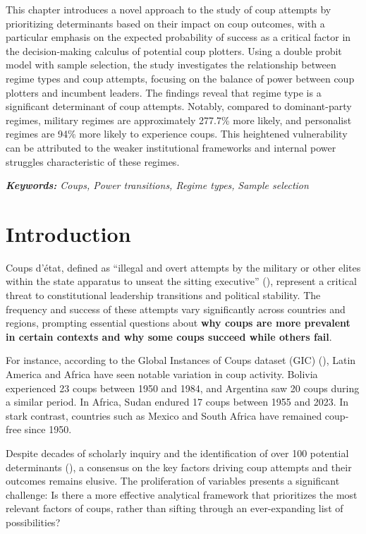 \documentclass[
  12pt,
]{report}
\begin{document}
This chapter introduces a novel approach to the study of coup attempts
by prioritizing determinants based on their impact on coup outcomes,
with a particular emphasis on the expected probability of success as a
critical factor in the decision-making calculus of potential coup
plotters. Using a double probit model with sample selection, the study
investigates the relationship between regime types and coup attempts,
focusing on the balance of power between coup plotters and incumbent
leaders. The findings reveal that regime type is a significant
determinant of coup attempts. Notably, compared to dominant-party
regimes, military regimes are approximately 277.7\% more likely, and
personalist regimes are 94\% more likely to experience coups. This
heightened vulnerability can be attributed to the weaker institutional
frameworks and internal power struggles characteristic of these regimes.

\emph{\textbf{Keywords:} Coups, Power transitions, Regime types,}
\emph{Sample selection}

\newpage

\section{Introduction}\label{introduction-1}

Coups d'état, defined as ``illegal and overt attempts by the military or
other elites within the state apparatus to unseat the sitting
executive'' (),
represent a critical threat to constitutional leadership transitions and
political stability. The frequency and success of these attempts vary
significantly across countries and regions, prompting essential
questions about \textbf{why coups are more prevalent in certain contexts
and why some coups succeed while others fail}.

For instance, according to the Global Instances of Coups dataset (GIC)
(), Latin America
and Africa have seen notable variation in coup activity. Bolivia
experienced 23 coups between 1950 and 1984, and Argentina saw 20 coups
during a similar period. In Africa, Sudan endured 17 coups between 1955
and 2023. In stark contrast, countries such as Mexico and South Africa
have remained coup-free since 1950.

Despite decades of scholarly inquiry and the identification of over 100
potential determinants (), a consensus on the key factors driving coup attempts
and their outcomes remains elusive. The proliferation of variables
presents a significant challenge: Is there a more effective analytical
framework that prioritizes the most relevant factors of coups, rather
than sifting through an ever-expanding list of possibilities?
\end{document}
